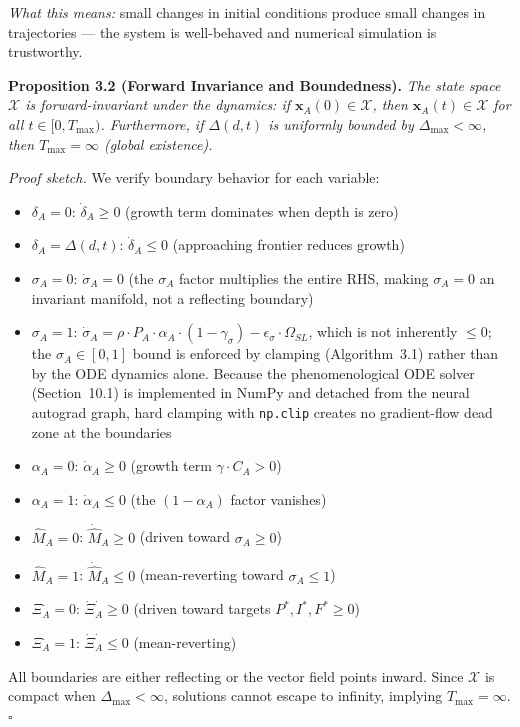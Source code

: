 \documentclass[10pt]{article}
\begin{document}
\noindent\textit{What this means:} small changes in initial conditions
produce small changes in trajectories --- the system is well-behaved and
numerical simulation is trustworthy.

\textbf{Proposition 3.2 (Forward Invariance and Boundedness).} %
\textit{The state space $\mathcal{X}$ is forward-invariant under the dynamics:
if $\mathbf{x}_A(0) \in \mathcal{X}$, then $\mathbf{x}_A(t) \in \mathcal{X}$
for all $t \in [0, T_{\max})$. Furthermore, if $\Delta(d,t)$ is uniformly
bounded by $\Delta_{\max} < \infty$, then $T_{\max} = \infty$ (global existence).}

\textit{Proof sketch.} We verify boundary behavior for each variable:
\begin{itemize}[nosep]
\item $\delta_A = 0$: $\dot{\delta}_A \geq 0$ (growth term dominates when depth is zero)
\item $\delta_A = \Delta(d,t)$: $\dot{\delta}_A \leq 0$ (approaching frontier reduces growth)
\item $\sigma_A = 0$: $\dot{\sigma}_A = 0$ (the $\sigma_A$ factor multiplies the entire RHS, making $\sigma_A=0$ an invariant manifold, not a reflecting boundary)
\item $\sigma_A = 1$: $\dot{\sigma}_A = \rho \cdot P_A \cdot \alpha_A \cdot (1-\gamma_\sigma) - \epsilon_\sigma \cdot \Omega_{SL}$, which is not inherently $\leq 0$; the $\sigma_A \in [0,1]$ bound is enforced by clamping (Algorithm~3.1) rather than by the ODE dynamics alone. Because the phenomenological ODE solver (Section~10.1) is implemented in NumPy and detached from the neural autograd graph, hard clamping with \texttt{np.clip} creates no gradient-flow dead zone at the boundaries
\item $\alpha_A = 0$: $\dot{\alpha}_A \geq 0$ (growth term $\gamma \cdot C_A > 0$)
\item $\alpha_A = 1$: $\dot{\alpha}_A \leq 0$ (the $(1-\alpha_A)$ factor vanishes)
\item $\hat{M}_A = 0$: $\dot{\hat{M}}_A \geq 0$ (driven toward $\sigma_A \geq 0$)
\item $\hat{M}_A = 1$: $\dot{\hat{M}}_A \leq 0$ (mean-reverting toward $\sigma_A \leq 1$)
\item $\Xi_A^{\cdot} = 0$: $\dot{\Xi}_A^{\cdot} \geq 0$ (driven toward targets $P^*, I^*, F^* \geq 0$)
\item $\Xi_A^{\cdot} = 1$: $\dot{\Xi}_A^{\cdot} \leq 0$ (mean-reverting)
\end{itemize}
All boundaries are either reflecting or the vector field points inward.
Since $\mathcal{X}$ is compact when $\Delta_{\max} < \infty$, solutions
cannot escape to infinity, implying $T_{\max} = \infty$. $\square$
\end{document}
